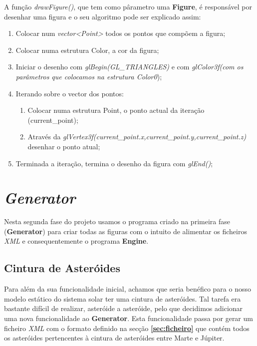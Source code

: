 \documentclass[a4paper]{article}
\begin{document}
\rmfamily

  \vspace{0.3cm}

 A função \textit{drawFigure()}, que tem como pârametro uma \textbf{Figure}, é responsável por desenhar uma figura e o seu algoritmo pode ser explicado assim:

\ttfamily

  \vspace{0.3cm}

\begin{enumerate}
 \item Colocar num \textit{vector<Point>} todos os pontos que compõem a figura;
 \item Colocar numa estrutura Color, a cor da figura;
 \item Iniciar o desenho com \textit{glBegin(GL\_TRIANGLES)} e com \textit{glColor3f(com os parâmetros que colocamos na estrutura Color0});
 \item Iterando sobre o vector dos pontos:
	\begin{enumerate}
	\item Colocar numa estrutura Point, o ponto actual da iteração (current\_point);
	\item Através da \textit{glVertex3f(current\_point.x,current\_point.y,current\_point.z)} desenhar o ponto atual;
	\end{enumerate}
\item Terminada a iteração, termina o desenho da figura com \textit{glEnd()};
\end{enumerate}

\rmfamily

\newpage

\section{\textit{Generator}}

Nesta segunda fase do projeto usamos o programa criado na primeira fase (\textbf{Generator}) para criar todas as figuras com o intuito de alimentar os ficheiros \emph{XML} e consequentemente o programa \textbf{Engine}.

\subsection{Cintura de Asteróides}

Para além da sua funcionalidade inicial, achamos que seria benéfico para o nosso modelo estático do sistema solar ter uma cintura de asteróides. Tal tarefa era bastante difícil de realizar, asteróide a asteróide, pelo que decidimos adicionar uma nova funcionalidade ao \textbf{Generator}. Esta funcionalidade passa por gerar um ficheiro \emph{XML} com o formato definido na secção \textbf{\ref{sec:ficheiro}} que contém todos os asteróides pertencentes à cintura de asteróides entre Marte e Júpiter.
\end{document}
